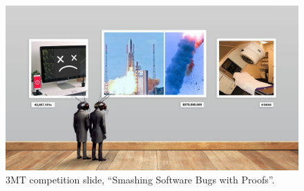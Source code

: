 \begin{figure}[tb]
    \centering
    \includegraphics[width=\columnwidth]{img/3mt.jpg}
    \caption{3MT competition slide, \enquote{Smashing Software Bugs with Proofs}.}
    \label{fig:3mt-slide}
\end{figure}